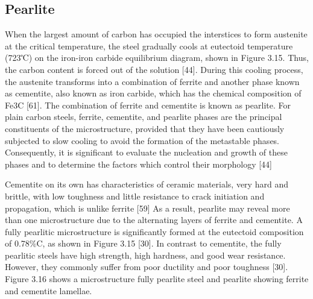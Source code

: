 \documentclass[12pt]{report}
\begin{document}
\subsection{Pearlite} 
When the largest amount of carbon has occupied the interstices to form austenite at the critical temperature, the steel gradually cools at eutectoid temperature (723℃) on the iron-iron carbide equilibrium diagram, shown in Figure 3.15. Thus, the carbon content is forced out of the solution [44]. During this cooling process, the austenite transforms into a combination of ferrite and another phase known as cementite, also known as iron carbide, which has the chemical composition of Fe3C [61]. The combination of ferrite and cementite is known as pearlite.  
For plain carbon steels, ferrite, cementite, and pearlite phases are the principal constituents of the microstructure, provided that they have been cautiously subjected to slow cooling to avoid the formation of the metastable phases. Consequently, it is significant to evaluate the nucleation and growth of these phases and to determine the factors which control their morphology [44]
 

Cementite on its own has characteristics of ceramic materials, very hard and brittle, with low toughness and little resistance to crack initiation and propagation, which is unlike ferrite [59] As a result, pearlite may reveal more than one microstructure due to the alternating layers of ferrite and cementite. A fully pearlitic microstructure is significantly formed at the eutectoid composition of 0.78\%C, as shown in Figure 3.15 [30]. In contrast to cementite, the fully pearlitic steels have high strength, high hardness, and good wear resistance. However, they commonly suffer from poor ductility and poor toughness [30]. Figure 3.16 shows a microstructure fully pearlite steel and pearlite showing ferrite and cementite lamellae.

\end{document}
